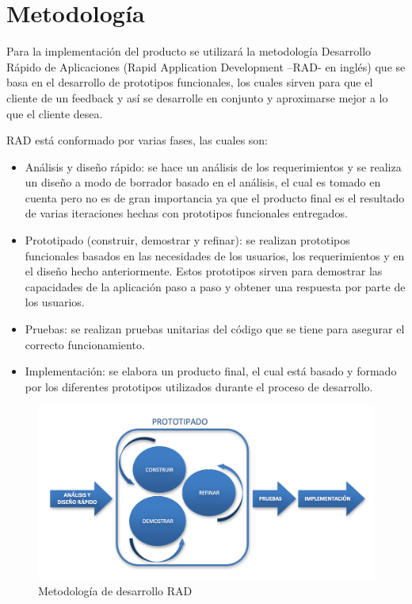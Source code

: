 \chapter{Metodología}
Para la implementación del producto se utilizará la metodología Desarrollo Rápido de Aplicaciones (Rapid Application Development –RAD- en inglés) que se basa en el desarrollo de prototipos funcionales, los cuales sirven para que el cliente de un feedback y así se desarrolle en conjunto y aproximarse mejor a lo que el cliente desea.

RAD está conformado por varias fases, las cuales son:
\begin{itemize}
\item Análisis y diseño rápido: se hace un análisis de los requerimientos y se realiza un diseño a modo de borrador basado en el análisis, el cual es tomado en cuenta pero no es de gran importancia ya que el producto final es el resultado de varias iteraciones hechas con prototipos funcionales entregados.
\item Prototipado (construir, demostrar y refinar): se realizan prototipos funcionales basados en las necesidades de los usuarios, los requerimientos y en el diseño hecho anteriormente. Estos prototipos sirven para demostrar las capacidades de la aplicación paso a paso y obtener una respuesta por parte de los usuarios.
\item Pruebas: se realizan pruebas unitarias del código que se tiene para asegurar el correcto funcionamiento.
\item Implementación: se elabora un producto final, el cual está basado y formado por los diferentes prototipos utilizados durante el proceso de desarrollo.
\end{itemize}
\begin{figure}
\centering
\includegraphics[scale=0.5]{imagenes/metodologia}
\caption{Metodología de desarrollo RAD}
\label{fig:metodologia}
\end{figure}

